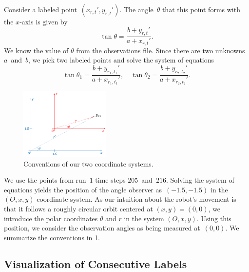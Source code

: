\documentclass[twoside]{article}
\begin{document}
Consider a labeled point~${(x_{r, t}', y_{r, t}')}$.
The angle~$\theta$ that this point forms with the $x$-axis is given by
\begin{equation*}
  \tan\theta = \frac{b + y_{r, t}'}{a + x_{r, t}'}.
\end{equation*}
We know the value of $\theta$ from the observations file.
Since there are two unknowns $a$~and~$b$, we pick two labeled points and solve the system of equations
\begin{equation*}
  \tan\theta_1 = \frac{b + y_{r_1, t_1}'}{a + x_{r_1, t_1}'}, \quad \tan\theta_2 = \frac{b + y_{r_2, t_2}'}{a + x_{r_2, t_2}'}.
\end{equation*}
\begin{figure}[h]
  \centering
  \includegraphics[width=0.40\textwidth]{images/AK2}
  \caption{Conventions of our two coordinate systems.}\label{fig:conventions}
\end{figure}
We use the points from run~$1$ time steps $205$~and~$216$.
Solving the system of equations yields the position of the angle observer as~$(-1.5, -1.5)$ in the ${(O, x, y)}$ coordinate system.
As our intuition about the robot's movement is that it follows a roughly circular orbit centered at ${(x, y) = (0, 0)}$, we introduce the polar coordinates $\theta$ and $r$ in the system ${(O, x, y)}$.
Using this position, we consider the observation angles as being measured at~$(0, 0)$.
We summarize the conventions in \cref{fig:conventions}.

\subsection{Visualization of Consecutive Labels}\label{sec:visu-cons-labels}
\end{document}

